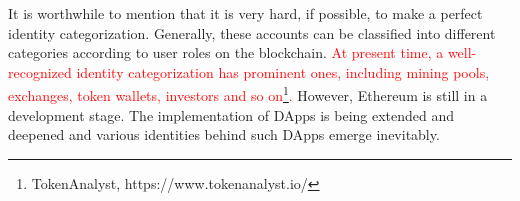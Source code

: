 


It is worthwhile to mention that it is very hard, if possible, to make a perfect identity categorization. Generally, these accounts can be classified into different categories according to user roles on the blockchain. \textcolor{red}{At present time, a well-recognized identity categorization has prominent ones, including mining pools, exchanges, token wallets, investors and so on\footnote{TokenAnalyst, https://www.tokenanalyst.io/}.}
 However, Ethereum is still in a development stage. The implementation of DApps is being extended and deepened and various identities behind such DApps emerge inevitably.



